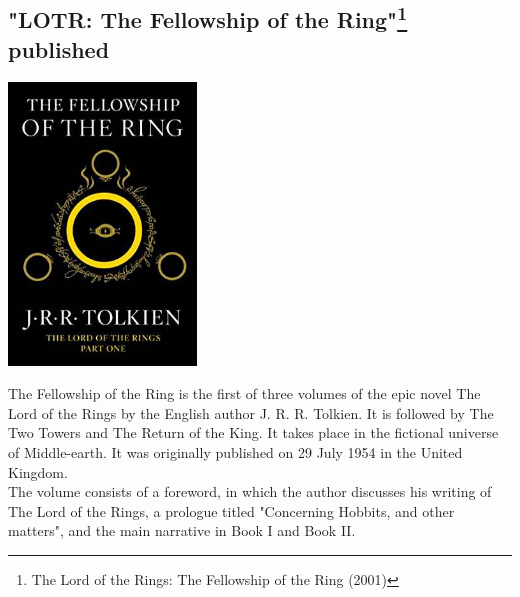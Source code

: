 \documentclass[11pt]{report}
\begin{document}
\subsection{"LOTR: The Fellowship of the Ring"\protect\footnote{The Lord of the Rings: The Fellowship of the Ring (2001)} published}
\vspace{2mm}\begin{center}\includegraphics[width=5cm]{./img/lotrbook1.jpg}\end{center}
The Fellowship of the Ring is the first of three volumes of the epic novel The Lord of the Rings by the English author J. R. R. Tolkien. It is followed by The Two Towers and The Return of the King. It takes place in the fictional universe of Middle-earth. It was originally published on 29 July 1954 in the United Kingdom.\\
\indent The volume consists of a foreword, in which the author discusses his writing of The Lord of the Rings, a prologue titled "Concerning Hobbits, and other matters", and the main narrative in Book I and Book II.
\end{document}
